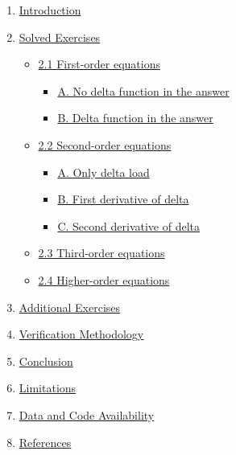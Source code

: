 \documentclass[
  11pt,
]{article}
\providecommand{\tightlist}{%
  \setlength{\itemsep}{0pt}\setlength{\parskip}{0pt}}
\begin{document}
\begin{enumerate}
\def\labelenumi{\arabic{enumi}.}
\tightlist
\item
  \protect\hyperlink{introduction}{Introduction}
\item
  \protect\hyperlink{solved-exercises}{Solved Exercises}

  \begin{itemize}
  \tightlist
  \item
    \protect\hyperlink{first-order-equations}{2.1 First-order equations}

    \begin{itemize}
    \tightlist
    \item
      \protect\hyperlink{first-order-a-no-delta}{A. No delta function in
      the answer}
    \item
      \protect\hyperlink{first-order-b-delta}{B. Delta function in the
      answer}
    \end{itemize}
  \item
    \protect\hyperlink{second-order-equations}{2.2 Second-order
    equations}

    \begin{itemize}
    \tightlist
    \item
      \protect\hyperlink{second-order-a-delta-load}{A. Only delta load}
    \item
      \protect\hyperlink{second-order-b-first-derivative}{B. First
      derivative of delta}
    \item
      \protect\hyperlink{second-order-c-second-derivative}{C. Second
      derivative of delta}
    \end{itemize}
  \item
    \protect\hyperlink{third-order-equations}{2.3 Third-order equations}
  \item
    \protect\hyperlink{higher-order-equations}{2.4 Higher-order
    equations}
  \end{itemize}
\item
  \protect\hyperlink{additional-exercises}{Additional Exercises}
\item
  \protect\hyperlink{verification-methodology}{Verification Methodology}
\item
  \protect\hyperlink{conclusion}{Conclusion}
\item
  \protect\hyperlink{limitations}{Limitations}
\item
  \protect\hyperlink{data-and-code-availability}{Data and Code
  Availability}
\item
  \protect\hyperlink{references}{References}
\end{enumerate}
\end{document}
